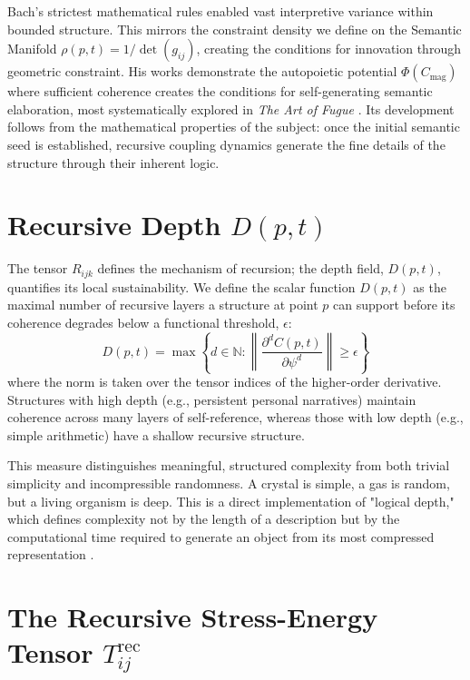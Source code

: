 Bach's strictest mathematical rules enabled vast interpretive variance within bounded structure. This mirrors the constraint density we define on the Semantic Manifold \(\rho(p,t) = 1/\det(g_{ij})\), creating the conditions for innovation through geometric constraint. His works demonstrate the autopoietic potential \(\Phi(C_{\text{mag}})\) where sufficient coherence creates the conditions for self-generating semantic elaboration, most systematically explored in \textit{The Art of Fugue} \autocite{Bach1751}. Its development follows from the mathematical properties of the subject: once the initial semantic seed is established, recursive coupling dynamics generate the fine details of the structure through their inherent logic.

\section{\texorpdfstring{Recursive Depth $D(p, t)$}{Recursive Depth D(p, t)}}

The tensor \(R_{ijk}\) defines the mechanism of recursion; the depth field, \(D(p, t)\), quantifies its local sustainability. We define the scalar function \(D(p,t)\) as the maximal number of recursive layers a structure at point \(p\) can support before its coherence degrades below a functional threshold, \(\epsilon\):
\begin{equation}
D(p, t) = \max \left\{ d \in \mathbb{N} : \left\| \frac{\partial^d C(p,t)}{\partial \psi^d} \right\| \geq \epsilon \right\}
\end{equation}
where the norm is taken over the tensor indices of the higher-order derivative. Structures with high depth (e.g., persistent personal narratives) maintain coherence across many layers of self-reference, whereas those with low depth (e.g., simple arithmetic) have a shallow recursive structure.

This measure distinguishes meaningful, structured complexity from both trivial simplicity and incompressible randomness. A crystal is simple, a gas is random, but a living organism is deep. This is a direct implementation of "logical depth," which defines complexity not by the length of a description but by the computational time required to generate an object from its most compressed representation \autocite{Bennett1988}.

\section{\texorpdfstring{The Recursive Stress-Energy Tensor $T_{ij}^{\text{rec}}$}{The Recursive Stress-Energy Tensor Tij_rec}}\label{sec:stress_energy_tensor}

